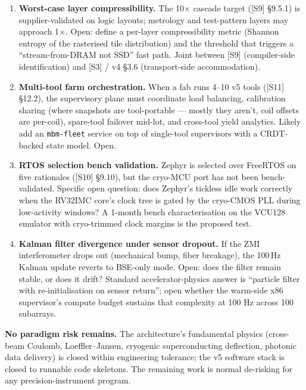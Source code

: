 \documentclass[11pt,letterpaper]{article}
\begin{document}
\begin{enumerate}[leftmargin=1.6em,start=7]
  \item \textbf{Worst-case layer compressibility.} The 10$\times$ cascade target ([S9] \S 9.5.1) is supplier-validated on logic layouts; metrology and test-pattern layers may approach 1$\times$. Open: define a per-layer compressibility metric (Shannon entropy of the rasterised tile distribution) and the threshold that triggers a ``stream-from-DRAM not SSD'' fast path. Joint between [S9] (compiler-side identification) and [S3] / v4 \S 3.6 (transport-side accommodation).
  \item \textbf{Multi-tool farm orchestration.} When a fab runs 4--10 v5 tools ([S11] \S 12.2), the supervisory plane must coordinate load balancing, calibration sharing (where snapshots are tool-portable --- mostly they aren't, coil offsets are per-coil), spare-tool failover mid-lot, and cross-tool yield analytics. Likely add an \texttt{mbm-fleet} service on top of single-tool supervisors with a CRDT-backed state model. Open.
  \item \textbf{RTOS selection bench validation.} Zephyr is selected over FreeRTOS on five rationales ([S10] \S 9.10), but the cryo-MCU port has not been bench-validated. Specific open question: does Zephyr's tickless idle work correctly when the RV32IMC core's clock tree is gated by the cryo-CMOS PLL during low-activity windows? A 1-month bench characterisation on the VCU128 emulator with cryo-trimmed clock margins is the proposed test.
  \item \textbf{Kalman filter divergence under sensor dropout.} If the ZMI interferometer drops out (mechanical bump, fiber breakage), the 100\,Hz Kalman update reverts to BSE-only mode. Open: does the filter remain stable, or does it drift? Standard accelerator-physics answer is ``particle filter with re-initialisation on sensor return''; open whether the warm-side x86 supervisor's compute budget sustains that complexity at 100 Hz across 100 subarrays.
\end{enumerate}

\textbf{No paradigm risk remains.} The architecture's fundamental physics (cross-beam Coulomb, Loeffler--Jansen, cryogenic superconducting deflection, photonic data delivery) is closed within engineering tolerance; the v5 software stack is closed to runnable code skeletons. The remaining work is normal de-risking for any precision-instrument program.

\end{document}
